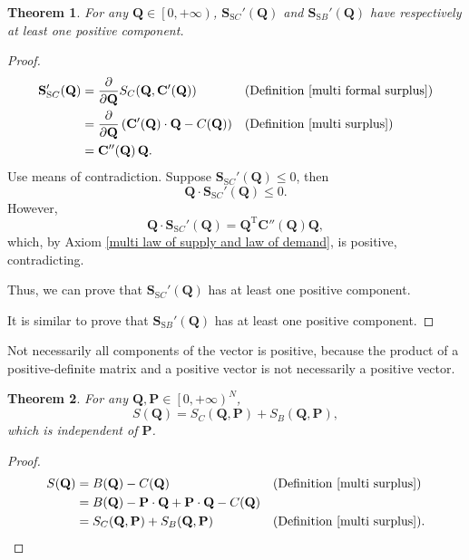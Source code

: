 \documentclass{article}
\newtheorem{theorem}{Theorem}[subsection]
\begin{document}
\begin{theorem}
For any $\mathbf Q\in\left[0,+\infty\right)$,
$\mathbf S_{\mathrm SC}'\!\left(\mathbf Q\right)$ and $\mathbf S_{\mathrm SB}'\!\left(\mathbf Q\right)$ have respectively at least one positive component.
\end{theorem}
\begin{proof}
\begin{align*}
\mathbf S_{\mathrm SC}'\!\left(\mathbf Q\right)&=\frac\partial{\partial\mathbf Q}S_C\!\left(\mathbf Q,\mathbf C'\!\left(\mathbf Q\right)\right)&&\text{(Definition \ref{multi formal surplus})}\\
&=\frac\partial{\partial\mathbf Q}\left(\mathbf C'\!\left(\mathbf Q\right)\cdot\mathbf Q-C\!\left(\mathbf Q\right)\right)&&\text{(Definition \ref{multi surplus})}\\
&=\mathbf C''\!\left(\mathbf Q\right)\mathbf Q.
\end{align*}
Use means of contradiction.
Suppose $\mathbf S_{\mathrm SC}'\!\left(\mathbf Q\right)\le0$, then
$$\mathbf Q\cdot\mathbf S_{\mathrm SC}'\!\left(\mathbf Q\right)\le0.$$
However,
$$\mathbf Q\cdot\mathbf S_{\mathrm SC}'\!\left(\mathbf Q\right)=\mathbf Q^\mathrm T\mathbf C''\!\left(\mathbf Q\right)\mathbf Q,$$
which, by Axiom \ref{multi law of supply and law of demand}, is positive, contradicting.

Thus, we can prove that $\mathbf S_{\mathrm SC}'\!\left(\mathbf Q\right)$ has at least one positive component.

It is similar to prove that $\mathbf S_{\mathrm SB}'\!\left(\mathbf Q\right)$ has at least one positive component.
\end{proof}

Not necessarily all components of the vector is positive, because the product of a positive-definite matrix and a positive vector is not necessarily a positive vector.

\begin{theorem}
For any $\mathbf Q,\mathbf P\in\left[0,+\infty\right)^N$,
$$S\!\left(\mathbf Q\right)=S_C\!\left(\mathbf Q,\mathbf P\right)+S_B\!\left(\mathbf Q,\mathbf P\right),$$
which is independent of $\mathbf P$.
\end{theorem}
\begin{proof}
\begin{align*}
S\!\left(\mathbf Q\right)&=B\!\left(\mathbf Q\right)-C\!\left(\mathbf Q\right)&&\text{(Definition \ref{multi surplus})}\\
&=B\!\left(\mathbf Q\right)-\mathbf P\cdot\mathbf Q+\mathbf P\cdot\mathbf Q-C\!\left(\mathbf Q\right)\\
&=S_C\!\left(\mathbf Q,\mathbf P\right)+S_B\!\left(\mathbf Q,\mathbf P\right)&&\text{(Definition \ref{multi surplus})}.
\end{align*}
\end{proof}
\end{document}
